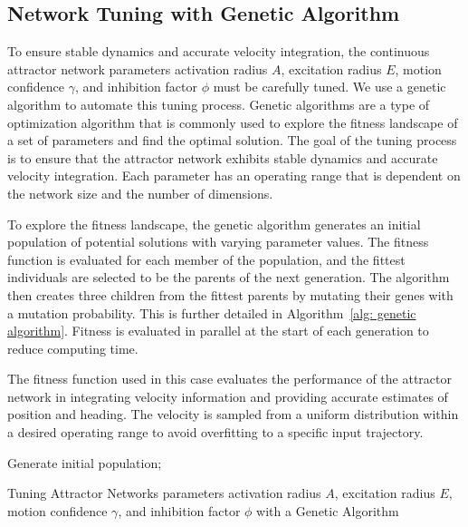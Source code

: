 %

\subsection{Network Tuning with Genetic Algorithm}
\label{subsec:tuning}
To ensure stable dynamics and accurate velocity integration, the continuous attractor network parameters activation radius $A$, excitation radius $E$, motion confidence $\gamma$, and inhibition factor $\phi$ must be carefully tuned.  
%
We use a genetic algorithm \cite{katoch2021review} to automate this tuning process. Genetic algorithms are a type of optimization algorithm that is commonly used to explore the fitness landscape of a set of parameters and find the optimal solution. The goal of the tuning process is to ensure that the attractor network exhibits stable dynamics and accurate velocity integration. Each parameter has an operating range that is dependent on the network size and the number of dimensions.

To explore the fitness landscape, the genetic algorithm generates an initial population of potential solutions with varying parameter values. The fitness function is evaluated for each member of the population, and the fittest individuals are selected to be the parents of the next generation. The algorithm then creates three children from the fittest parents by mutating their genes with a mutation probability. This is further detailed in Algorithm~\ref{alg: genetic algorithm}. Fitness is evaluated in parallel at the start of each generation to reduce computing time.

The fitness function used in this case evaluates the performance of the attractor network in integrating velocity information and providing accurate estimates of position and heading. The velocity is sampled from a uniform distribution within a desired operating range to avoid overfitting to a specific input trajectory.

%

\begin{algorithm}[t]
\vspace{2mm}
Generate initial population;\\
\caption{Tuning Attractor Networks parameters activation radius $A$, excitation radius $E$, motion confidence $\gamma$, and inhibition factor $\phi$ with a Genetic Algorithm}
\label{alg: genetic algorithm}
\end{algorithm}

